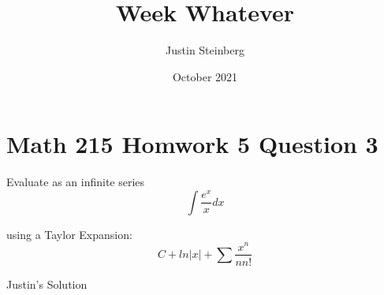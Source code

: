 \documentclass{article}
\title{Week Whatever}
\author{Justin Steinberg}
\date{October 2021}
\begin{document}
\maketitle

\section{Math 215 Homwork 5 Question 3}

Evaluate as an infinite series
\begin{equation}
    \int{\frac{e^x}{x} dx}
\end{equation}

using a Taylor Expansion:
\begin{equation}
    C + ln|x| + \sum{\frac{x^n}{nn!}}
\end{equation}

\begin{frame}{Justin's Solution}
    
\end{frame}
\end{document}
